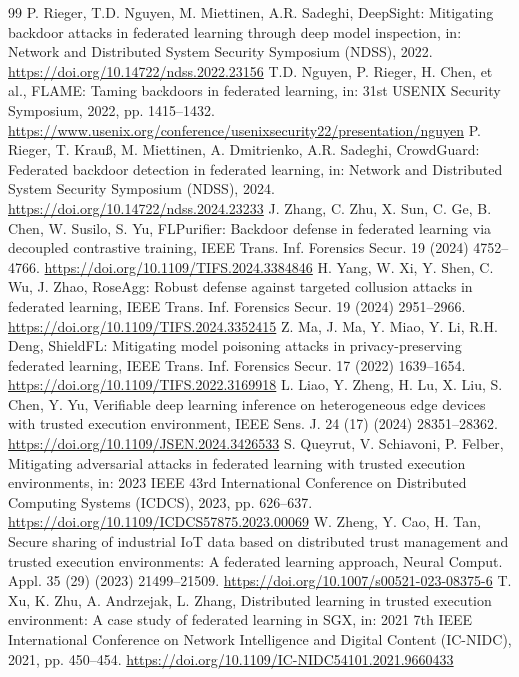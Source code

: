 \documentclass[11pt, a4paper]{article}
\begin{document}
\begin{thebibliography}{99}
     P. Rieger, T.D. Nguyen, M. Miettinen, A.R. Sadeghi, DeepSight: Mitigating backdoor attacks in federated learning through deep model inspection, in: Network and Distributed System Security Symposium (NDSS), 2022. \url{https://doi.org/10.14722/ndss.2022.23156}
     T.D. Nguyen, P. Rieger, H. Chen, et al., FLAME: Taming backdoors in federated learning, in: 31st USENIX Security Symposium, 2022, pp. 1415--1432. \url{https://www.usenix.org/conference/usenixsecurity22/presentation/nguyen}
     P. Rieger, T. Krau{\ss}, M. Miettinen, A. Dmitrienko, A.R. Sadeghi, CrowdGuard: Federated backdoor detection in federated learning, in: Network and Distributed System Security Symposium (NDSS), 2024. \url{https://doi.org/10.14722/ndss.2024.23233}
     J. Zhang, C. Zhu, X. Sun, C. Ge, B. Chen, W. Susilo, S. Yu, FLPurifier: Backdoor defense in federated learning via decoupled contrastive training, IEEE Trans. Inf. Forensics Secur. 19 (2024) 4752--4766. \url{https://doi.org/10.1109/TIFS.2024.3384846}
     H. Yang, W. Xi, Y. Shen, C. Wu, J. Zhao, RoseAgg: Robust defense against targeted collusion attacks in federated learning, IEEE Trans. Inf. Forensics Secur. 19 (2024) 2951--2966. \url{https://doi.org/10.1109/TIFS.2024.3352415}
     Z. Ma, J. Ma, Y. Miao, Y. Li, R.H. Deng, ShieldFL: Mitigating model poisoning attacks in privacy-preserving federated learning, IEEE Trans. Inf. Forensics Secur. 17 (2022) 1639--1654. \url{https://doi.org/10.1109/TIFS.2022.3169918}
     L. Liao, Y. Zheng, H. Lu, X. Liu, S. Chen, Y. Yu, Verifiable deep learning inference on heterogeneous edge devices with trusted execution environment, IEEE Sens. J. 24 (17) (2024) 28351--28362. \url{https://doi.org/10.1109/JSEN.2024.3426533}
     S. Queyrut, V. Schiavoni, P. Felber, Mitigating adversarial attacks in federated learning with trusted execution environments, in: 2023 IEEE 43rd International Conference on Distributed Computing Systems (ICDCS), 2023, pp. 626--637. \url{https://doi.org/10.1109/ICDCS57875.2023.00069}
     W. Zheng, Y. Cao, H. Tan, Secure sharing of industrial IoT data based on distributed trust management and trusted execution environments: A federated learning approach, Neural Comput. Appl. 35 (29) (2023) 21499--21509. \url{https://doi.org/10.1007/s00521-023-08375-6}
     T. Xu, K. Zhu, A. Andrzejak, L. Zhang, Distributed learning in trusted execution environment: A case study of federated learning in SGX, in: 2021 7th IEEE International Conference on Network Intelligence and Digital Content (IC-NIDC), 2021, pp. 450--454. \url{https://doi.org/10.1109/IC-NIDC54101.2021.9660433}

\end{thebibliography}
\end{document}
